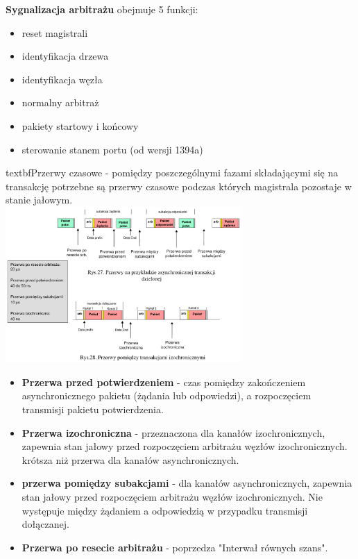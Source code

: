 \textbf{Sygnalizacja arbitrażu} obejmuje 5 funkcji:
\begin{itemize}
	\item reset magistrali
	\item identyfikacja drzewa
	\item identyfikacja węzła
	\item normalny arbitraż
	\item pakiety startowy i końcowy
	\item sterowanie stanem portu (od wersji 1394a)
\end{itemize}
textbf{Przerwy czasowe} - pomiędzy poszczególnymi fazami składającymi się na transakcję potrzebne są przerwy czasowe podczas których magistrala pozostaje w stanie jałowym.\\
\includegraphics[width=9cm]{./wyklady/FIREWIRE_29_1.pdf}\\
\begin{itemize}
	\item \textbf{Przerwa przed potwierdzeniem} - czas pomiędzy zakończeniem asynchronicznego pakietu (żądania lub odpowiedzi), a rozpoczęciem transmisji pakietu potwierdzenia.
	\item \textbf{Przerwa izochroniczna} - przeznaczona dla kanałów izochronicznych, zapewnia stan jałowy przed rozpoczęciem arbitrażu węzłów izochronicznych. krótsza niż przerwa dla kanałów asynchronicznych.
	\item \textbf{przerwa pomiędzy subakcjami} - dla kanałów asynchronicznych, zapewnia stan jałowy przed rozpoczęciem arbitrażu węzłów izochronicznych. Nie występuje między żądaniem a odpowiedzią w przypadku transmisji dołączanej.
	\item \textbf{Przerwa po resecie arbitrażu} - poprzedza "Interwał równych szans".
\end{itemize}

